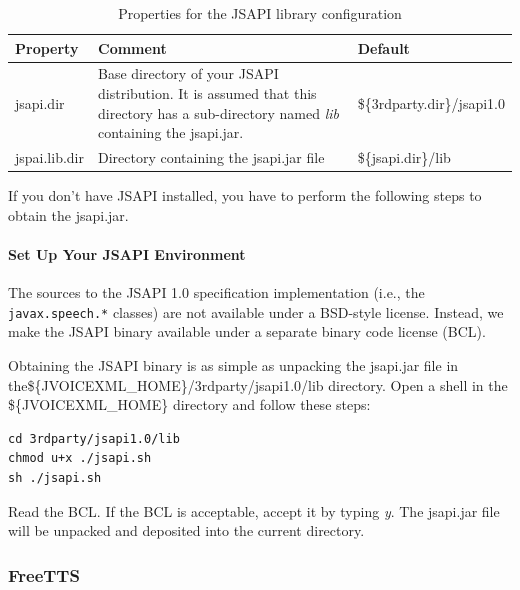 \documentclass[11pt,a4paper]{article}
\begin{document}
\begin{table}[h]
\caption{Properties for the JSAPI library configuration}
\label{tab:jsapi_properties}

\begin{center}

\begin{tabular}{|l|p{4cm}|l|}
\hline
\textbf{Property} & \textbf{Comment} & \textbf{Default} \\
\hline
\hline
jsapi.dir & 
Base directory of your JSAPI distribution. It is assumed that this directory
has a sub-directory named \emph{lib} containing the jsapi.jar.
& \$\{3rdparty.dir\}/jsapi1.0 \\
\hline
jspai.lib.dir & 
Directory containing the jsapi.jar file 
& \$\{jsapi.dir\}/lib \\
\hline
\end{tabular}
\end{center}

\end{table}

If you don't have JSAPI installed, you have to perform the following steps 
to obtain the jsapi.jar.

\paragraph{Set Up Your JSAPI Environment}

The sources to the JSAPI 1.0 specification implementation (i.e., the
\texttt{javax.speech.*} classes) are not available under a
BSD-style license.  Instead, we make the JSAPI binary
available under a separate binary code license (BCL).

Obtaining the JSAPI binary is as simple as unpacking
the jsapi.jar file in the\$\{JVOICEXML\_HOME\}/3rdparty/jsapi1.0/lib
directory. Open a shell in the \$\{JVOICEXML\_HOME\} directory and
follow these steps:

\begin{lstlisting}
cd 3rdparty/jsapi1.0/lib
chmod u+x ./jsapi.sh
sh ./jsapi.sh
\end{lstlisting}

Read the BCL. If the BCL is acceptable, accept it by typing \emph{y}.
The jsapi.jar file will be unpacked and deposited into the current directory.

\subsubsection{FreeTTS}
\label{sec:freetts}
\end{document}
